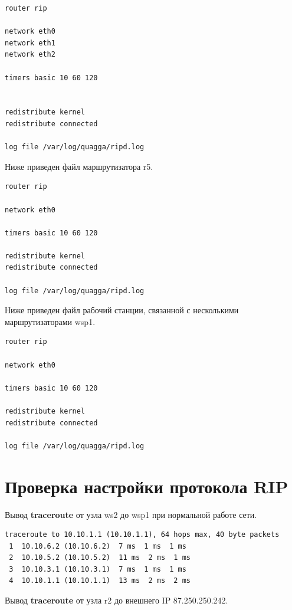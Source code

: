\documentclass[a4paper,12pt]{article}
\begin{document}
\begin{Verbatim}
router rip

network eth0
network eth1
network eth2

timers basic 10 60 120


redistribute kernel
redistribute connected

log file /var/log/quagga/ripd.log

\end{Verbatim}

Ниже приведен файл  маршрутизатора r5.

\begin{Verbatim}
router rip

network eth0

timers basic 10 60 120

redistribute kernel
redistribute connected

log file /var/log/quagga/ripd.log

\end{Verbatim}


Ниже приведен файл  рабочий станции, связанной с несколькими маршрутизаторами wsp1.

\begin{Verbatim}
router rip

network eth0

timers basic 10 60 120

redistribute kernel
redistribute connected

log file /var/log/quagga/ripd.log

\end{Verbatim}


\section{Проверка настройки протокола RIP}

Вывод \textbf{traceroute} от узла ws2 до wsp1 при нормальной работе сети.

\begin{Verbatim}
traceroute to 10.10.1.1 (10.10.1.1), 64 hops max, 40 byte packets
 1  10.10.6.2 (10.10.6.2)  7 ms  1 ms  1 ms
 2  10.10.5.2 (10.10.5.2)  11 ms  2 ms  1 ms
 3  10.10.3.1 (10.10.3.1)  7 ms  1 ms  1 ms
 4  10.10.1.1 (10.10.1.1)  13 ms  2 ms  2 ms
\end{Verbatim}

Вывод \textbf{traceroute} от узла r2 до внешнего IP 87.250.250.242.
\end{document}
